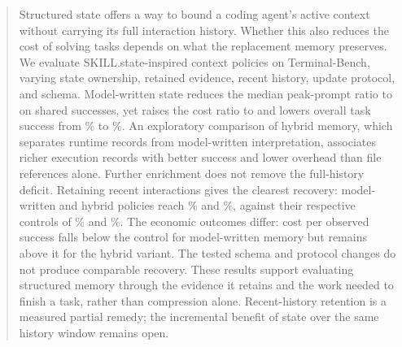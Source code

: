 \begin{abstract}
Structured state offers a way to bound a coding agent's active context
without carrying its full interaction history. Whether this also reduces
the cost of solving tasks depends on what the replacement memory preserves.
We evaluate SKILL.state-inspired context policies on Terminal-Bench,
varying state ownership, retained evidence, recent history, update protocol,
and schema. Model-written state reduces the median peak-prompt ratio to
\ModelStatePeakRatio{} on shared successes, yet raises the cost ratio to
\ModelStateCostRatio{} and lowers overall task success from
\ModelControlRate\% to \ModelStateRate\%. An exploratory comparison of
hybrid memory, which separates runtime records from model-written
interpretation, associates richer execution records with better success
and lower overhead than file references alone. Further enrichment does
not remove the full-history deficit. Retaining recent interactions gives
the clearest recovery: model-written and hybrid policies reach
\ModelHistorySixRate\% and \HybridHistorySixRate\%, against their respective
controls of \ModelControlRate\% and \HybridControlRate\%. The economic
outcomes differ: cost per observed success falls below the control for
model-written memory but remains above it for the hybrid variant.
The tested schema and protocol changes do not produce comparable recovery.
These results support evaluating structured memory through the evidence
it retains and the work needed to finish a task, rather than compression
alone. Recent-history retention is a measured partial remedy; the
incremental benefit of state over the same history window remains open.
\end{abstract}
